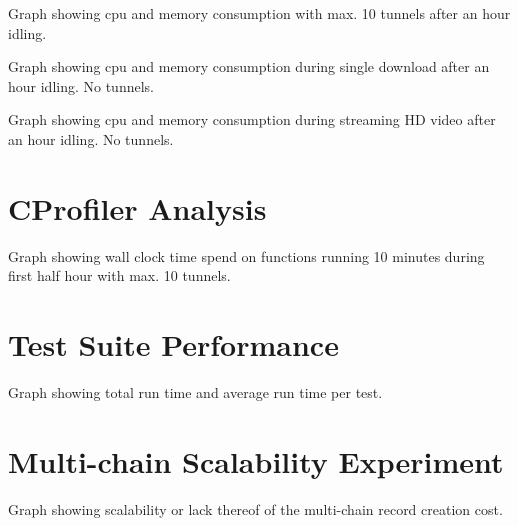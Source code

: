 \documentclass[]{report}
\begin{document}
Graph showing cpu and memory consumption with max. 10 tunnels after an hour idling.

Graph showing cpu and memory consumption during single download after an hour idling. No tunnels.

Graph showing cpu and memory consumption during streaming HD video after an hour idling. No tunnels.


\section{CProfiler Analysis}
Graph showing wall clock time spend on functions running 10 minutes during first half hour with max. 10 tunnels.


\section{Test Suite Performance}
Graph showing total run time and average run time per test.


\section{Multi-chain Scalability Experiment}
Graph showing scalability or lack thereof of the multi-chain record creation cost.
\end{document}
